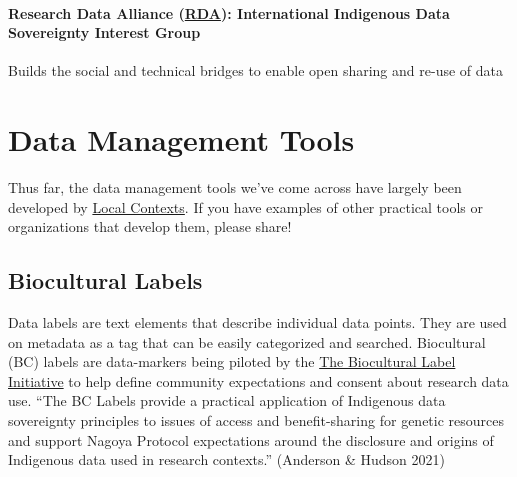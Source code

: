 \documentclass[
]{book}
\begin{document}
\hypertarget{research-data-alliance-rda-international-indigenous-data-sovereignty-interest-group}{%
\subsubsection*{\texorpdfstring{Research Data Alliance (\href{https://www.rd-alliance.org/groups/international-indigenous-data-sovereignty-ig}{RDA}): International Indigenous Data Sovereignty Interest Group}{Research Data Alliance (RDA): International Indigenous Data Sovereignty Interest Group}}\label{research-data-alliance-rda-international-indigenous-data-sovereignty-interest-group}}

Builds the social and technical bridges to enable open sharing and re-use of data

\hypertarget{data-management-tools}{%
\chapter{Data Management Tools}\label{data-management-tools}}

Thus far, the data management tools we've come across have largely been developed by \href{https://localcontexts.org/labels/biocultural-labels/}{Local Contexts}. If you have examples of other practical tools or organizations that develop them, please share!

\hypertarget{biocultural-labels}{%
\section{Biocultural Labels}\label{biocultural-labels}}

Data labels are text elements that describe individual data points. They are used on metadata as a tag that can be easily categorized and searched. Biocultural (BC) labels are data-markers being piloted by the \href{https://www.enrich-hub.org/bc-labels}{The Biocultural Label Initiative} to help define community expectations and consent about research data use. ``The BC Labels provide a practical application of Indigenous data sovereignty principles to issues of access and benefit-sharing for genetic resources and support Nagoya Protocol expectations around the disclosure and origins of Indigenous data used in research contexts.'' (Anderson \& Hudson 2021)
\end{document}
